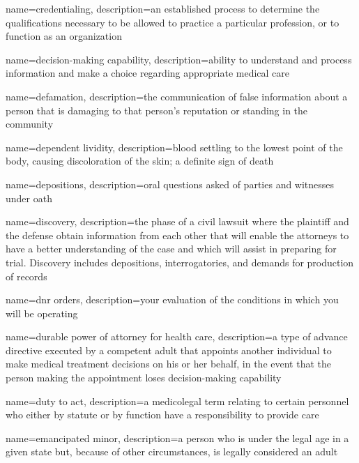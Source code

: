 \documentclass[../../EMT-169.tex]{subfiles}
\begin{document}
	{
		name=credentialing,
		description={an established process to determine the qualifications necessary to be allowed to practice a particular profession, or to function as an organization}
	}

	{
		name=decision-making capability,
		description={ability to understand and process information and make a choice regarding appropriate medical care}
	}

	{
		name=defamation,
		description={the communication of false information about a person that is damaging to that person's reputation or standing in the community}
	}

	{
		name=dependent lividity,
		description={blood settling to the lowest point of the body, causing discoloration of the skin; a definite sign of death}
	}

	{
		name=depositions,
		description={oral questions asked of parties and witnesses under oath}
	}

	{
		name=discovery,
		description={the phase of a civil lawsuit where the plaintiff and the defense obtain information from each other that will enable the attorneys to have a better understanding of the case and which will assist in preparing for trial.  Discovery includes depositions, interrogatories, and demands for production of records}
	}

	{
		name=\acrfull{dnr} orders,
		description={your evaluation of the conditions in which you will be operating}
	}

	{
		name=durable power of attorney for health care,
		description={a type of advance directive executed by a competent adult that appoints another individual to make medical treatment decisions on his or her behalf, in the event that the person making the appointment loses decision-making capability}
	}

	{
		name=duty to act,
		description={a medicolegal term relating to certain personnel who either by statute or by function have a responsibility to provide care}
	}

	{
		name=emancipated minor,
		description={a person who is under the legal age in a given state but, because of other circumstances, is legally considered an adult}
	}
\end{document}

